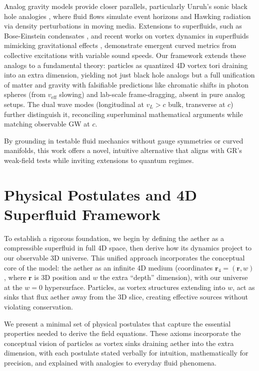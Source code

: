 \documentclass{article}
\begin{document}
Analog gravity models provide closer parallels, particularly Unruh's sonic black hole analogies \cite{unruh1995sonic}, where fluid flows simulate event horizons and Hawking radiation via density perturbations in moving media. Extensions to superfluids, such as Bose-Einstein condensates \cite{garay2000sonic}, and recent works on vortex dynamics in superfluids mimicking gravitational effects \cite{simula2020gravitational, svancara2024rotating}, demonstrate emergent curved metrics from collective excitations with variable sound speeds. Our framework extends these analogs to a fundamental theory: particles as quantized 4D vortex tori draining into an extra dimension, yielding not just black hole analogs but a full unification of matter and gravity with falsifiable predictions like chromatic shifts in photon spheres (from $v_{\text{eff}}$ slowing) and lab-scale frame-dragging, absent in pure analog setups. The dual wave modes (longitudinal at $v_L > c$ bulk, transverse at $c$) further distinguish it, reconciling superluminal mathematical arguments while matching observable GW at $c$.

By grounding in testable fluid mechanics without gauge symmetries or curved manifolds, this work offers a novel, intuitive alternative that aligns with GR's weak-field tests while inviting extensions to quantum regimes.

\section{Physical Postulates and 4D Superfluid Framework}

To establish a rigorous foundation, we begin by defining the aether as a compressible superfluid in full 4D space, then derive how its dynamics project to our observable 3D universe. This unified approach incorporates the conceptual core of the model: the aether as an infinite 4D medium (coordinates $\mathbf{r}_4 = (\mathbf{r}, w)$, where $\mathbf{r}$ is 3D position and $w$ the extra ``depth'' dimension), with our universe at the $w=0$ hypersurface. Particles, as vortex structures extending into $w$, act as sinks that flux aether away from the 3D slice, creating effective sources without violating conservation.

We present a minimal set of physical postulates that capture the essential properties needed to derive the field equations. These axioms incorporate the conceptual vision of particles as vortex sinks draining aether into the extra dimension, with each postulate stated verbally for intuition, mathematically for precision, and explained with analogies to everyday fluid phenomena.
\end{document}
